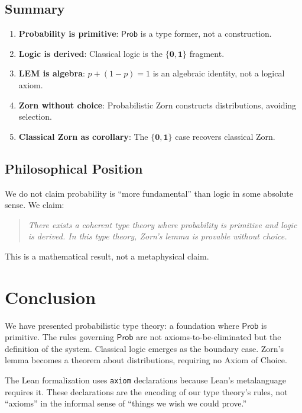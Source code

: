 \documentclass[11pt,a4paper]{article}
\newcommand{\Prob}{\mathsf{Prob}}
\newcommand{\pzero}{\mathbf{0}}
\newcommand{\pone}{\mathbf{1}}
\begin{document}
\subsection{Summary}

\begin{enumerate}
    \item \textbf{Probability is primitive}: $\Prob$ is a type former, not a construction.
    \item \textbf{Logic is derived}: Classical logic is the $\{\pzero, \pone\}$ fragment.
    \item \textbf{LEM is algebra}: $p + (1-p) = 1$ is an algebraic identity, not a logical axiom.
    \item \textbf{Zorn without choice}: Probabilistic Zorn constructs distributions, avoiding selection.
    \item \textbf{Classical Zorn as corollary}: The $\{\pzero, \pone\}$ case recovers classical Zorn.
\end{enumerate}

\subsection{Philosophical Position}

We do not claim probability is ``more fundamental'' than logic in some absolute sense. We claim:

\begin{quote}
\emph{There exists a coherent type theory where probability is primitive and logic is derived. In this type theory, Zorn's lemma is provable without choice.}
\end{quote}

This is a mathematical result, not a metaphysical claim.

\section{Conclusion}

We have presented probabilistic type theory: a foundation where $\Prob$ is primitive. The rules governing $\Prob$ are not axioms-to-be-eliminated but the definition of the system. Classical logic emerges as the boundary case. Zorn's lemma becomes a theorem about distributions, requiring no Axiom of Choice.

The Lean formalization uses \texttt{axiom} declarations because Lean's metalanguage requires it. These declarations are the encoding of our type theory's rules, not ``axioms'' in the informal sense of ``things we wish we could prove.''
\end{document}
